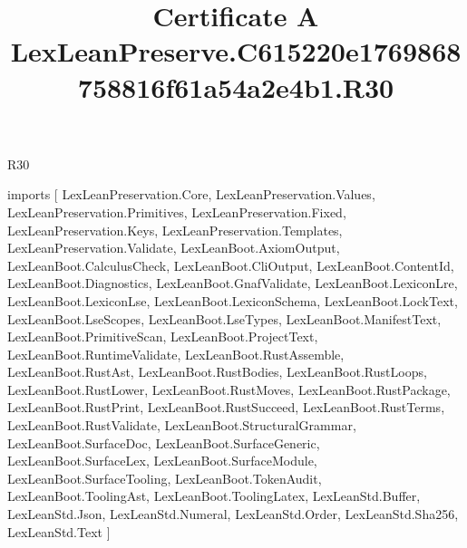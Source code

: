 \begin{lexlean}{R30}
\title{Certificate A LexLeanPreserve.C615220e1769868758816f61a54a2e4b1.R30}
\begin{coremodule}
imports [
  LexLeanPreservation.Core,
  LexLeanPreservation.Values,
  LexLeanPreservation.Primitives,
  LexLeanPreservation.Fixed,
  LexLeanPreservation.Keys,
  LexLeanPreservation.Templates,
  LexLeanPreservation.Validate,
  LexLeanBoot.AxiomOutput,
  LexLeanBoot.CalculusCheck,
  LexLeanBoot.CliOutput,
  LexLeanBoot.ContentId,
  LexLeanBoot.Diagnostics,
  LexLeanBoot.GnafValidate,
  LexLeanBoot.LexiconLre,
  LexLeanBoot.LexiconLse,
  LexLeanBoot.LexiconSchema,
  LexLeanBoot.LockText,
  LexLeanBoot.LseScopes,
  LexLeanBoot.LseTypes,
  LexLeanBoot.ManifestText,
  LexLeanBoot.PrimitiveScan,
  LexLeanBoot.ProjectText,
  LexLeanBoot.RuntimeValidate,
  LexLeanBoot.RustAssemble,
  LexLeanBoot.RustAst,
  LexLeanBoot.RustBodies,
  LexLeanBoot.RustLoops,
  LexLeanBoot.RustLower,
  LexLeanBoot.RustMoves,
  LexLeanBoot.RustPackage,
  LexLeanBoot.RustPrint,
  LexLeanBoot.RustSucceed,
  LexLeanBoot.RustTerms,
  LexLeanBoot.RustValidate,
  LexLeanBoot.StructuralGrammar,
  LexLeanBoot.SurfaceDoc,
  LexLeanBoot.SurfaceGeneric,
  LexLeanBoot.SurfaceLex,
  LexLeanBoot.SurfaceModule,
  LexLeanBoot.SurfaceTooling,
  LexLeanBoot.TokenAudit,
  LexLeanBoot.ToolingAst,
  LexLeanBoot.ToolingLatex,
  LexLeanStd.Buffer,
  LexLeanStd.Json,
  LexLeanStd.Numeral,
  LexLeanStd.Order,
  LexLeanStd.Sha256,
  LexLeanStd.Text
]


\end{coremodule}
\end{lexlean}
